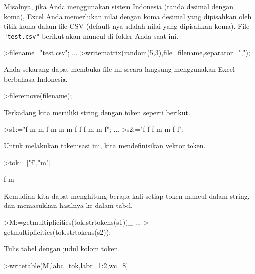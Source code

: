 \documentclass[a4paper,11pt,oneside,enabledeprecatedfontcommands]{scrbook}
\newenvironment{eulernotebook}{}{}
\newenvironment{eulercomment}{\par\medskip\noindent}{\par\medskip}
\begin{document}
\begin{eulernotebook}
\begin{eulercomment}
			Misalnya, jika Anda menggunakan sistem Indonesia (tanda desimal dengan koma), Excel Anda memerlukan
			nilai dengan koma desimal yang dipisahkan oleh titik koma dalam file CSV (default-nya adalah nilai
			yang dipisahkan koma). File \texttt{"test.csv"} berikut akan muncul di folder Anda saat ini.
		\end{eulercomment}
		\begin{eulerprompt}
			>filename="test.csv"; ...
			>writematrix(random(5,3),file=filename,separator=",");
		\end{eulerprompt}
		\begin{eulercomment}
			Anda sekarang dapat membuka file ini secara langsung menggunakan Excel berbahasa Indonesia.
		\end{eulercomment}
		\begin{eulerprompt}
			>fileremove(filename);
		\end{eulerprompt}
		\begin{eulercomment}
			Terkadang kita memiliki string dengan token seperti berikut.
		\end{eulercomment}
		\begin{eulerprompt}
			>s1:="f m m f m m m f f f m m f";  ...
			>s2:="f f f m m f f";
		\end{eulerprompt}
		\begin{eulercomment}
			Untuk melakukan tokenisasi ini, kita mendefinisikan vektor token.
		\end{eulercomment}
		\begin{eulerprompt}
			>tok:=["f","m"]
		\end{eulerprompt}
		\begin{euleroutput}
			f
			m
		\end{euleroutput}
		\begin{eulercomment}
			Kemudian kita dapat menghitung berapa kali setiap token muncul dalam string, dan memasukkan hasilnya
			ke dalam tabel.
		\end{eulercomment}
		\begin{eulerprompt}
			>M:=getmultiplicities(tok,strtokens(s1))_ ...
			>  getmultiplicities(tok,strtokens(s2));
		\end{eulerprompt}
		\begin{eulercomment}
			Tulis tabel dengan judul kolom token.
		\end{eulercomment}
		\begin{eulerprompt}
			>writetable(M,labc=tok,labr=1:2,wc=8)
		\end{eulerprompt}
		\begin{euleroutput}

\end{euleroutput}
\end{eulernotebook}
\end{document}
